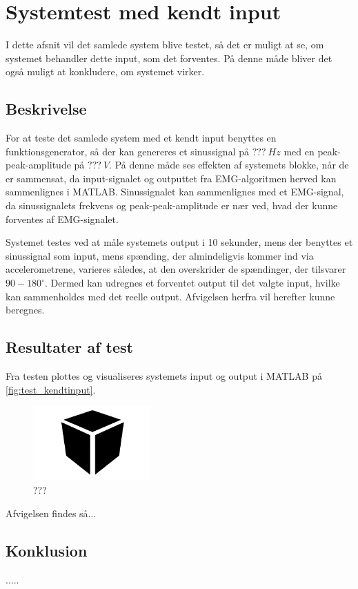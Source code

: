 \section{Systemtest med kendt input}
I dette afsnit vil det samlede system blive testet, så det er muligt at se, om systemet behandler dette input, som det forventes. På denne måde bliver det også muligt at konkludere, om systemet virker. 

\subsection{Beskrivelse}
For at teste det samlede system med et kendt input benyttes en funktionsgenerator, så der kan genereres et sinussignal på $???~Hz$ med en peak-peak-amplitude på $???~V$. På denne måde ses effekten af systemets blokke, når de er sammensat, da input-signalet og outputtet fra EMG-algoritmen herved kan sammenlignes i MATLAB. Sinussignalet kan sammenlignes med et EMG-signal, da sinussignalets frekvens og peak-peak-amplitude er nær ved, hvad der kunne forventes af EMG-signalet. 

Systemet testes ved at måle systemets output i 10 sekunder, mens der benyttes et sinussignal som input, mens spænding, der almindeligvis kommer ind via accelerometrene, varieres således, at den overskrider de spændinger, der tilsvarer $90-180^{\circ}$. 
Dermed kan udregnes et forventet output til det valgte input, hvilke kan sammenholdes med det reelle output. Afvigelsen herfra vil herefter kunne beregnes. 
 
\subsection{Resultater af test}
Fra testen plottes og visualiseres systemets input og output i MATLAB på \autoref{fig:test_kendtinput}. 

\begin{figure}[H]
\centering
\includegraphics[width=0.4\textwidth]{figures/blackbox.jpg}
\caption{???}
\label{fig:test_kendtinput}
\end{figure}

Afvigelsen findes så...

\subsection{Konklusion}
.....